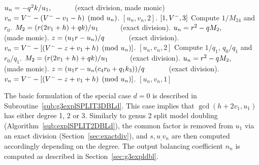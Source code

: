 \begin{subroutine}[htbp]
\caption{Genus 3 Split Model Degree 3 Doubling ($r_1 = 0$)\label{sub:g3explSPLIT3DBLr1}}
\begin{algorithmic} [1]
    \State $u_n = -q^2k/u_1, \quad\quad\quad$ (exact division, made monic)
    \State $v_n = V^{-} - (V^{-} - v_1 - h) \pmod{u_n}$.
    \State \Return $[u_n,v_n,2]$.
\Else
         \Return $[1,V^{-},3]$
        \Else
            \State Compute $1/M_{24}$ and $r_0$.
            \State $M_2 = (r(2v_1 + h) + qk)/u_1 \quad\quad\quad $(exact division).
            \State $u_n = r^2 - qM_2, \quad\quad\quad $ (made monic).
            \State $z = (u_1r - u_n)/q \quad\quad\quad$ (exact division).
            \State $v_n = V^{-} - [(V^{-} - z + v_1 + h) \pmod{u_n}]$.
            \State \Return $[u_n,v_n,2]$
        \EndIf
    \EndIf
    \State Compute $1/q_1$, $q_0/q_1$ and $r_0/q_1$.
    \State $M_2 = (r(2v_1 + h) + qk)/u_1 \quad\quad\quad $(exact division).
    \State $u_n = r^2 - qM_2, \quad\quad\quad $ (made monic).
    \State $z = (u_1r - u_n(c_4r_0 + q_1k_3))/q \quad\quad\quad$ (exact division).
    \State $v_n = V^{-} - [(V^{-} - z + v_1 + h) \pmod{u_n}]$.
    \State \Return $[u_n,v_n,1]$
\EndIf
\end{algorithmic}
\end{subroutine}

The basic formulation of the special case $d = 0$ is described in
Subroutine~\ref{sub:g3explSPLIT3DBLd}. This case implies that
$\gcd{(h + 2v_1, u_1)}$ has either degree 1, 2 or 3. Similarly to genus 2 split
model doubling (Algorithm~\ref{sub:explSPLIT2DBLd}), the common factor is
removed from $u_1$ via an exact division (Section~\ref{sec:exactdiv}), and
$s,u_,v_n$ are then computed accordingly depending on the degree.
The output balancing coefficient $n_n$ is computed as described in
Section~\ref{sec:g3expldbl}.


